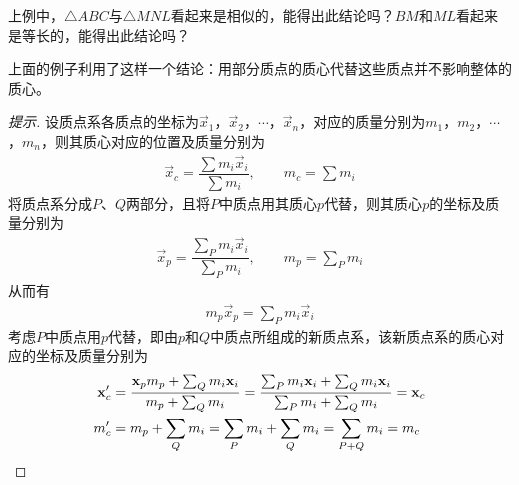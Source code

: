 \begin{question}
上例中，$\triangle ABC$与$\triangle MNL$看起来是相似的，能得出此结论吗？$BM$和$ML$看起来是等长的，能得出此结论吗？
\end{question}


\begin{example}
  上面的例子利用了这样一个结论：用部分质点的质心代替这些质点并不影响整体的质心。
\end{example}
\begin{proof}[提示]
  设质点系各质点的坐标为$\vec x_1$，$\vec x_2$，$\cdots$，$\vec x_n$，对应的质量分别为$m_1$，$m_2$，$\cdots$，$m_n$，则其质心对应的位置及质量分别为
  \begin{align*}
    \vec x_c = \dfrac{\sum m_i \vec x_i}{\sum m_i},\qquad m_c = \sum m_i
  \end{align*}
  将质点系分成$P$、$Q$两部分，且将$P$中质点用其质心$p$代替，则其质心$p$的坐标及质量分别为
  \begin{align*}
    \vec x_p={}\dfrac{\sum_P m_i\vec x_i}{\sum_P m_i},\qquad
    m_p={} \sum_P m_i
  \end{align*}
  从而有
  \begin{align*}
    m_p \vec x_p = \sum_P m_i\vec x_i
  \end{align*}
  考虑$P$中质点用$p$代替，即由$p$和$Q$中质点所组成的新质点系，该新质点系的质心对应的坐标及质量分别为
  \begin{align*}
    \vec x_c' ={}& \dfrac{ \vec x_p m_p + \sum_{Q} m_i\vec x_i}{ m_p + \sum_{Q} m_i} = \dfrac{\sum_P m_i \vec x_i + \sum_Q m_i \vec x_i}{\sum_P m_i + \sum_Q m_i} = \vec x_c\\
    m_c' ={}& m_p + \sum_{Q} m_i  = \sum_{P} m_i + \sum_{Q} m_i = \sum_{P+Q} m_i = m_c \qedhere
  \end{align*}
\end{proof}